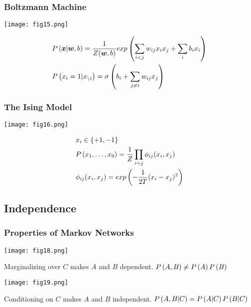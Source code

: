\subsubsection*{Boltzmann Machine}

\begin{minipage}{0.4\textwidth}
	\centering
	\texttt{[image: fig15.png]}
\end{minipage}
\begin{minipage}{0.6\textwidth}
	\begin{align*}
	&\P{\vec{x}|\vec{w},b}=\frac{1}{Z(\vec{w},b)}\e{\sum_{i<j}w_{ij}x_ix_j+\sum_ib_ix_i} \\
	&\P{x_i=1|x_{\setminus i}}=\si\left(b_i+\sum_{j\neq i}w_{ij}x_j\right)
	\end{align*}
\end{minipage}

\subsubsection*{The Ising Model}

\begin{minipage}{0.4\textwidth}
	\centering
	\texttt{[image: fig16.png]}
\end{minipage}
\begin{minipage}{0.6\textwidth}
	\begin{align*}
	&x_i\in\{+1,-1\} \\
	&\P{x_1,\dotsc,x_9}=\frac{1}{Z}\prod_{i\sim j}\ph_{ij}(x_i,x_j) \\
	&\ph_{ij}(x_i,x_j)=\e{-\frac{1}{2T}(x_i-x_j)^2}
	\end{align*}
\end{minipage}

\subsection{Independence}

\subsubsection*{Properties of Markov Networks}

\begin{minipage}{0.6\textwidth}
	\centering
	\texttt{[image: fig18.png]}
\end{minipage}
\begin{minipage}{0.4\textwidth}
	Marginalizing over $C$ makes $A$ and $B$ dependent. $\P{A,B}\neq\P{A}\P{B}$
\end{minipage}
\begin{minipage}{0.6\textwidth}
	\centering
	\texttt{[image: fig19.png]}
\end{minipage}
\begin{minipage}{0.4\textwidth}
	Conditioning on $C$ makes $A$ and $B$ independent. $\P{A,B|C}=\P{A|C}\P{B|C}$
\end{minipage}

